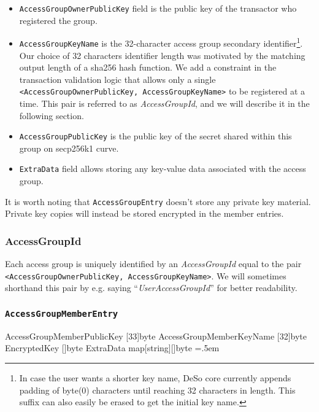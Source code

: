 \documentclass[oneside, 12pt]{article}
\newenvironment{lcverbatim}
 {\SaveVerbatim{cverb}}
 {\endSaveVerbatim
  \flushleft\fboxrule=0pt\fboxsep=.5em
  \colorbox{cverbbg}{%
    \makebox[\dimexpr\linewidth-2\fboxsep][l]{\BUseVerbatim{cverb}}%
  }
  \endflushleft
}
\newcommand{\ctexttt}[1]{\colorbox{cverbbg}{\texttt{#1}}}
\newcommand{\fn}[1]{\footnote{\hangpara{1.4em}{1} #1}}
\begin{document}
\begin{itemize}
  \item \texttt{AccessGroupOwnerPublicKey} field is the public key of the transactor who registered the group.

  \item \texttt{AccessGroupKeyName} is the 32-character access group secondary identifier\fn{In case the user wants a shorter key name, DeSo core currently appends padding of byte(0) characters until reaching 32 characters in length. This suffix can also easily be erased to get the initial key name.}. Our choice of 32 characters identifier length was motivated by the matching output length of a sha256 hash function. We add a constraint in the transaction validation logic that allows only a single \texttt{<AccessGroupOwnerPublicKey, AccessGroupKeyName>} to be registered at a time. This pair is referred to as \textit{AccessGroupId}, and we will describe it in the following section.

  \item \texttt{AccessGroupPublicKey} is the public key of the secret shared within this group on secp256k1 curve.

  \item \texttt{ExtraData} field allows storing any key-value data associated with the access group.

\end{itemize}

It is worth noting that \texttt{AccessGroupEntry} doesn’t store any private key material. Private key copies will instead be stored encrypted in the member entries.

\subsubsection{AccessGroupId}
Each access group is uniquely identified by an \textit{AccessGroupId} equal to the pair \newline \ctexttt{<AccessGroupOwnerPublicKey, AccessGroupKeyName>}. We will sometimes shorthand this pair by e.g. saying “\textit{UserAccessGroupId}” for better readability.

\subsubsection{\texttt{AccessGroupMemberEntry}}
\begin{lcverbatim}
{
   AccessGroupMemberPublicKey [33]byte
   AccessGroupMemberKeyName   [32]byte
   EncryptedKey               []byte
   ExtraData                  map[string][]byte
}
\end{lcverbatim}
\end{document}
